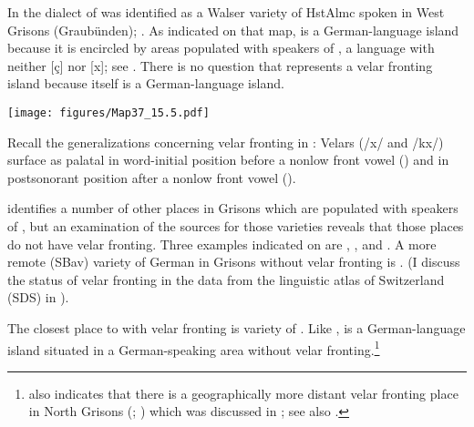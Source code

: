 {In  the dialect of  was identified as a Walser variety of HstAlmc spoken in West Grisons  (Graubünden); . As indicated on that map,  is a German-language island because it is encircled by areas populated with speakers of , a language with neither [ç] nor [x]; see \citet{Anderson2016}. There is no question that  represents a velar fronting island because  itself is a German-language island.


\begin{map}
\texttt{[image: figures/Map37\_15.5.pdf]}
\caption[Grisons]{Grisons. Velar fronting (postsonorant and/or word-initial) is depicted with a square and the absence of velar fronting with a circle. 1=\citet{Gröger1914a}, 2= \citet{Gröger1914b}, 3=\citet{Brun1918}, 4=\citet{Meinherz1920}, 5=\citet{Gröger1925}, 6=\citet{Kessler1931}, 7=\citet{Hotzenköcherle1934}. [Source for language borders: Kanton Graubünden in Wikipedia]}\label{map:37}
\end{map}

Recall the generalizations concerning velar fronting in : Velars (/x/ and /kx/) surface as palatal in word-initial position before a nonlow front vowel () and in postsonorant position after a nonlow front vowel ().

\citet[904--906]{Wiesinger1983b} identifies a number of other places in Grisons which are populated with speakers of , but an examination of the sources for those varieties reveals that those places do not have velar fronting. Three examples indicated on  are  \citep{Gröger1914a},  \citep{Hotzenköcherle1934}, and  \citep{Kessler1931}. A more remote (SBav) variety of German in Grisons without velar fronting is  \citep{Gröger1925}. (I discuss the status of velar fronting in the data from the linguistic atlas of Switzerland (SDS) in ).

The closest place to  with velar fronting is  variety of  \citep{Gröger1914b}. Like ,  is a German-language island situated in a German-speaking area without velar fronting.\footnote{{ also indicates that there is a geographically more distant velar fronting place in North Grisons (; \citealt{Meinherz1920}) which was discussed in ; see also .}}

}
